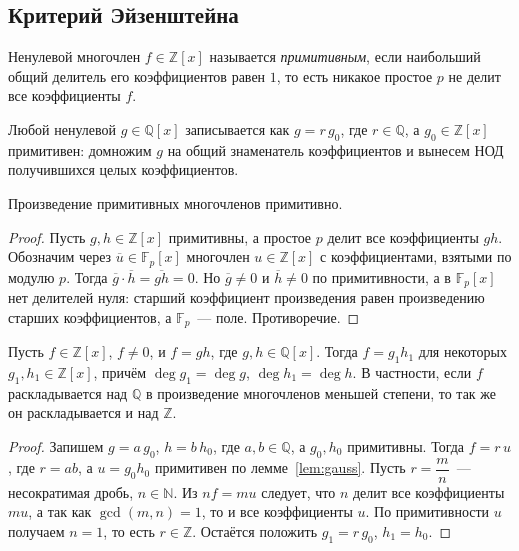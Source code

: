 \documentclass[12pt]{article}
\begin{document}
	\subsection{Критерий Эйзенштейна}

	\begin{definition}\label{def:primitive-poly}
		Ненулевой многочлен $f \in \mathbb{Z}[x]$ называется \emph{примитивным}, если наибольший общий делитель его коэффициентов равен $1$, то есть никакое простое $p$ не делит все коэффициенты $f$.
	\end{definition}

	\begin{note}
		Любой ненулевой $g \in \mathbb{Q}[x]$ записывается как $g = r\,g_0$, где $r \in \mathbb{Q}$, а $g_0 \in \mathbb{Z}[x]$ примитивен: домножим $g$ на общий знаменатель коэффициентов и вынесем НОД получившихся целых коэффициентов.
	\end{note}

	\begin{lemma}[Гаусса]\label{lem:gauss}
		Произведение примитивных многочленов примитивно.
	\end{lemma}

	\begin{proof}
		Пусть $g, h \in \mathbb{Z}[x]$ примитивны, а простое $p$ делит все коэффициенты $gh$. Обозначим через $\overline{u} \in \mathbb{F}_p[x]$ многочлен $u \in \mathbb{Z}[x]$ с коэффициентами, взятыми по модулю $p$. Тогда $\overline{g} \cdot \overline{h} = \overline{gh} = 0$. Но $\overline{g} \ne 0$ и $\overline{h} \ne 0$ по примитивности, а в $\mathbb{F}_p[x]$ нет делителей нуля: старший коэффициент произведения равен произведению старших коэффициентов, а $\mathbb{F}_p$~--- поле. Противоречие.
	\end{proof}

	\begin{corollary}\label{cor:gauss-Z-Q}
		Пусть $f \in \mathbb{Z}[x]$, $f \ne 0$, и $f = gh$, где $g, h \in \mathbb{Q}[x]$. Тогда $f = g_1h_1$ для некоторых $g_1, h_1 \in \mathbb{Z}[x]$, причём $\deg g_1 = \deg g$, $\deg h_1 = \deg h$. В частности, если $f$ раскладывается над $\mathbb{Q}$ в произведение многочленов меньшей степени, то так же он раскладывается и над $\mathbb{Z}$.
	\end{corollary}

	\begin{proof}
		Запишем $g = a\,g_0$, $h = b\,h_0$, где $a, b \in \mathbb{Q}$, а $g_0, h_0$ примитивны. Тогда $f = r\,u$, где $r = ab$, а $u = g_0h_0$ примитивен по лемме~\ref{lem:gauss}. Пусть $r = \dfrac{m}{n}$~--- несократимая дробь, $n \in \mathbb{N}$. Из $nf = mu$ следует, что $n$ делит все коэффициенты $mu$, а так как $\gcd(m, n) = 1$, то и все коэффициенты $u$. По примитивности $u$ получаем $n = 1$, то есть $r \in \mathbb{Z}$. Остаётся положить $g_1 = r\,g_0$, $h_1 = h_0$.
	\end{proof}
\end{document}
